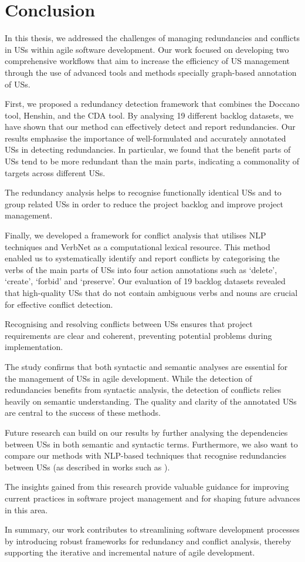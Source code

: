 \section{Conclusion}\label{conclusion}
In this thesis, we addressed the challenges of managing redundancies and conflicts in USs within agile software development. Our work focused on developing two comprehensive workflows that aim to increase the efficiency of US management through the use of advanced tools and methods specially graph-based annotation of USs.

First, we proposed a redundancy detection framework that combines the Doccano tool, Henshin, and the CDA tool. By analysing 19 different backlog datasets, we have shown that our method can effectively detect and report redundancies. Our results emphasise the importance of well-formulated and accurately annotated USs in detecting redundancies. In particular, we found that the benefit parts of USs tend to be more redundant than the main parts, indicating a commonality of targets across different USs.

The redundancy analysis helps to recognise functionally identical USs and to group related USs in order to reduce the project backlog and improve project management.

Finally, we developed a framework for conflict analysis that utilises NLP techniques and VerbNet as a computational lexical resource. This method enabled us to systematically identify and report conflicts by categorising the verbs of the main parts of USs into four action annotations such as ‘delete’, ‘create’, ‘forbid’ and ‘preserve’. Our evaluation of 19 backlog datasets revealed that high-quality USs that do not contain ambiguous verbs and nouns are crucial for effective conflict detection.

Recognising and resolving conflicts between USs ensures that project requirements are clear and coherent, preventing potential problems during implementation.

The study confirms that both syntactic and semantic analyses are essential for the management of USs in agile development. While the detection of redundancies benefits from syntactic analysis, the detection of conflicts relies heavily on semantic understanding. The quality and clarity of the annotated USs are central to the success of these methods.

Future research can build on our results by further analysing the dependencies between USs in both semantic and syntactic terms. Furthermore, we also want to compare our methods with NLP-based techniques that recognise redundancies between USs (as described in works such as \cite{duszkiewicz2022identifying,jurischsimilarity,levin1993english}). 

The insights gained from this research provide valuable guidance for improving current practices in software project management and for shaping future advances in this area.

In summary, our work contributes to streamlining software development processes by introducing robust frameworks for redundancy and conflict analysis, thereby supporting the iterative and incremental nature of agile development.